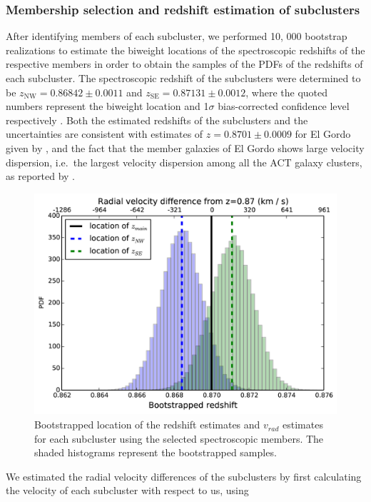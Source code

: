 \documentclass[letterpaper,useAMS,usenatbib]{mn2e}
\begin{document}
\subsubsection{Membership selection and redshift estimation of subclusters}
After identifying members of each subcluster, we performed 10, 000 bootstrap realizations to estimate the biweight
locations of the spectroscopic redshifts of the respective members in order
to obtain the samples of the PDFs of the redshifts of each subcluster. 
The spectroscopic redshift of the subclusters were
determined to be 
$z_{\mathrm{NW}} = 0.86842 \pm 0.0011$ and 
$z_{\mathrm{SE}} = 0.87131 \pm 0.0012$, where the quoted numbers represent the
biweight location and 1$\sigma$ bias-corrected confidence level
respectively \citep{Beers90}.  
Both the estimated redshifts of the subclusters and the uncertainties are
consistent with estimates of $z=0.8701 \pm 0.0009$ for El Gordo given by \citealt{Sifon13}, and the fact that the
member galaxies of El
Gordo shows large velocity dispersion, i.e.\ the largest velocity
dispersion among all the ACT galaxy clusters, as reported by
.
\begin{figure}
	\includegraphics[width = \linewidth]{bootstrapped_redshift.png}
	\caption{Bootstrapped location of the
	redshift estimates and $v_{rad}$ estimates for each subcluster using the
	selected spectroscopic members. The shaded histograms represent the
	bootstrapped samples.
} \label{fig:bootstrap_redshift}
\end{figure}
We estimated the radial velocity differences of the
subclusters by first calculating the velocity of each subcluster with
respect to us, using  
\end{document}

